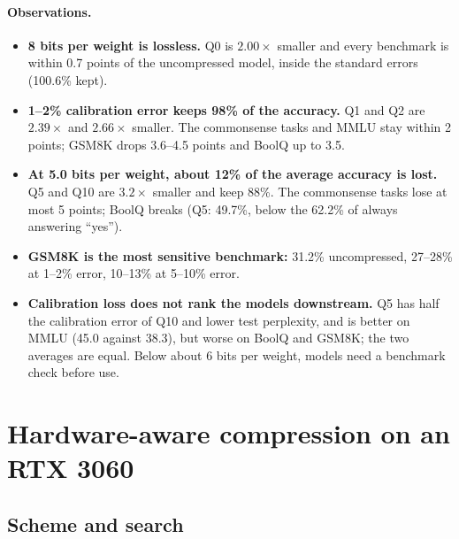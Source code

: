 \documentclass[11pt]{article}
\begin{document}
\FloatBarrier
\paragraph{Observations.}
\begin{itemize}
  \item \textbf{8 bits per weight is lossless.} Q0 is $2.00\times$ smaller and every benchmark is
        within 0.7 points of the uncompressed model, inside the standard errors (100.6\% kept).
  \item \textbf{1--2\% calibration error keeps 98\% of the accuracy.} Q1 and Q2 are $2.39\times$ and
        $2.66\times$ smaller. The commonsense tasks and MMLU stay within 2 points; GSM8K drops 3.6--4.5
        points and BoolQ up to 3.5.
  \item \textbf{At 5.0 bits per weight, about 12\% of the average accuracy is lost.} Q5 and Q10 are
        $3.2\times$ smaller and keep 88\%. The commonsense tasks lose at most 5 points; BoolQ breaks
        (Q5: 49.7\%, below the 62.2\% of always answering ``yes'').
  \item \textbf{GSM8K is the most sensitive benchmark:} 31.2\% uncompressed, 27--28\% at 1--2\%
        error, 10--13\% at 5--10\% error.
  \item \textbf{Calibration loss does not rank the models downstream.} Q5 has half the calibration
        error of Q10 and lower test perplexity, and is better on MMLU (45.0 against 38.3), but worse on
        BoolQ and GSM8K; the two averages are equal. Below about 6 bits per weight, models need a
        benchmark check before use.
\end{itemize}

\clearpage
\section{Hardware-aware compression on an RTX 3060}

\subsection{Scheme and search}
\end{document}
